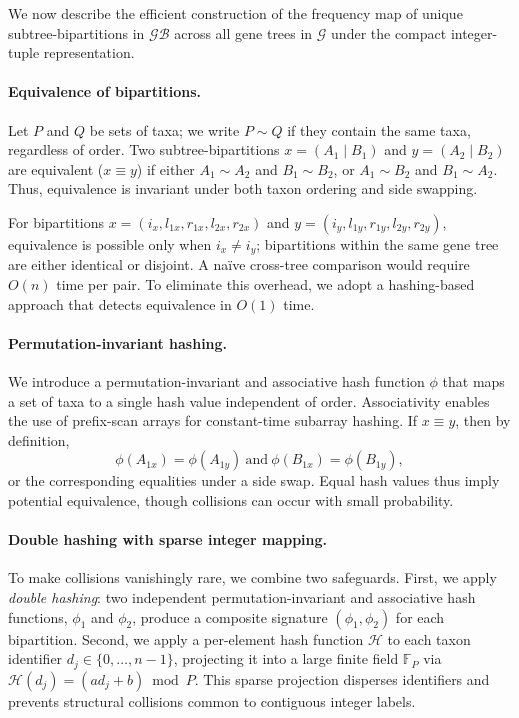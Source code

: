 \documentclass[10pt,a4paper]{article}
\begin{document}
\begin{enumerate}
We now describe the efficient construction of the frequency map of unique subtree-bipartitions in $\mathcal{GB}$ across all gene trees in $\mathcal{G}$ under the compact integer-tuple representation. 

\paragraph{Equivalence of bipartitions.}
Let $P$ and $Q$ be sets of taxa; we write $P \sim Q$ if they contain the same taxa, regardless of order. Two subtree-bipartitions $x = (A_1 \mid B_1)$ and $y = (A_2 \mid B_2)$ are equivalent ($x \equiv y$) if either $A_1 \sim A_2$ and $B_1 \sim B_2$, or $A_1 \sim B_2$ and $B_1 \sim A_2$. Thus, equivalence is invariant under both taxon ordering and side swapping.

For bipartitions $x = (i_x,l_{1x},r_{1x},l_{2x},r_{2x})$ and $y = (i_y,l_{1y},r_{1y},l_{2y},r_{2y})$, equivalence is possible only when $i_x \neq i_y$; bipartitions within the same gene tree are either identical or disjoint. A naïve cross-tree comparison would require $O(n)$ time per pair. To eliminate this overhead, we adopt a hashing-based approach that detects equivalence in $O(1)$ time.

\paragraph{Permutation-invariant hashing.}
We introduce a permutation-invariant and associative hash function $\phi$ that maps a set of taxa to a single hash value independent of order. Associativity enables the use of prefix-scan arrays for constant-time subarray hashing. If $x \equiv y$, then by definition,
\[
\phi(A_{1x}) = \phi(A_{1y}) \ \text{and}\  \phi(B_{1x}) = \phi(B_{1y}), 
\]
or the corresponding equalities under a side swap. Equal hash values thus imply potential equivalence, though collisions can occur with small probability.

\paragraph{Double hashing with sparse integer mapping.}
To make collisions vanishingly rare, we combine two safeguards.  
First, we apply \emph{double hashing}: two independent permutation-invariant and associative hash functions, $\phi_1$ and $\phi_2$, produce a composite signature $(\phi_1, \phi_2)$ for each bipartition.  
Second, we apply a per-element hash function $\mathcal{H}$ to each taxon identifier $d_j \in \{0,\ldots,n-1\}$, projecting it into a large finite field $\mathbb{F}_P$ via $\mathcal{H}(d_j) = (a d_j + b) \bmod P$. This sparse projection disperses identifiers and prevents structural collisions common to contiguous integer labels.


\end{enumerate}
\end{document}
